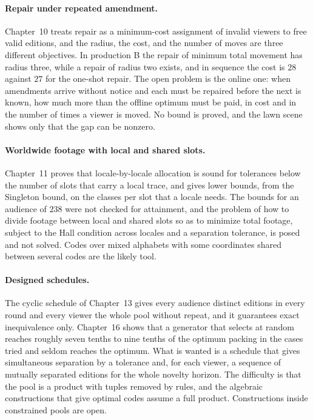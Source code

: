\documentclass[11pt,twoside,openright]{book}
\theoremstyle{plain}
\theoremstyle{definition}
\theoremstyle{remark}
\begin{document}
\paragraph{Repair under repeated amendment.} Chapter~10 treats repair as a minimum-cost assignment of invalid viewers to free valid editions, and the radius, the cost, and the number of moves are three different objectives. In production B the repair of minimum total movement has radius three, while a repair of radius two exists, and in sequence the cost is $28$ against $27$ for the one-shot repair. The open problem is the online one: when amendments arrive without notice and each must be repaired before the next is known, how much more than the offline optimum must be paid, in cost and in the number of times a viewer is moved. No bound is proved, and the lawn scene shows only that the gap can be nonzero.

\paragraph{Worldwide footage with local and shared slots.} Chapter~11 proves that locale-by-locale allocation is sound for tolerances below the number of slots that carry a local trace, and gives lower bounds, from the Singleton bound, on the classes per slot that a locale needs. The bounds for an audience of $238$ were not checked for attainment, and the problem of how to divide footage between local and shared slots so as to minimize total footage, subject to the Hall condition across locales and a separation tolerance, is posed and not solved. Codes over mixed alphabets with some coordinates shared between several codes are the likely tool.

\paragraph{Designed schedules.} The cyclic schedule of Chapter~13 gives every audience distinct editions in every round and every viewer the whole pool without repeat, and it guarantees exact inequivalence only. Chapter~16 shows that a generator that selects at random reaches roughly seven tenths to nine tenths of the optimum packing in the cases tried and seldom reaches the optimum. What is wanted is a schedule that gives simultaneous separation by a tolerance and, for each viewer, a sequence of mutually separated editions for the whole novelty horizon. The difficulty is that the pool is a product with tuples removed by rules, and the algebraic constructions that give optimal codes assume a full product. Constructions inside constrained pools are open.
\end{document}
